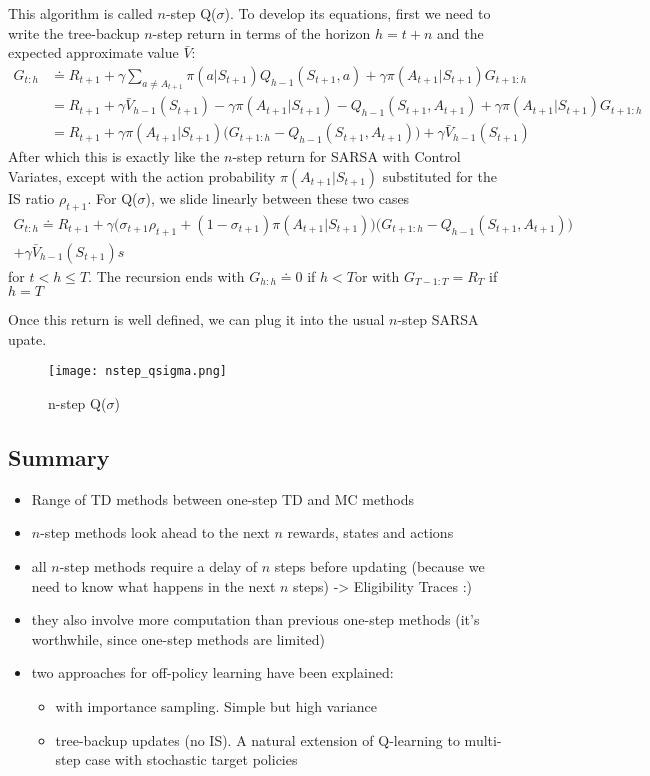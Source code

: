 \documentclass[sutton_barto_notes.tex]{subfiles}
\begin{document}
This algorithm is called $n$-step Q($\sigma$). To develop its equations, first we need to write the tree-backup $n$-step return in terms of the horizon $h = t + n$ and the expected approximate value $\bar{V}$:
\begin{align*}
G_{t:h} & \doteq R_{t+1} + \gamma \sum_{a \neq A_{t+1}} \pi(a| S_{t+1}) Q_{h-1}(S_{t+1}, a) + \gamma \pi(A_{t+1}|S_{t+1}) G_{t+1:h}\\
 & = R_{t+1} + \gamma \bar{V}_{h-1}(S_{t+1}) - \gamma \pi(A_{t+1} | S_{t+1}) - Q_{h-1}(S_{t+1}, A_{t+1}) + \gamma \pi(A_{t+1}|S_{t+1})G_{t+1:h}\\
 & = R_{t+1} + \gamma \pi(A_{t+1} | S_{t+1}) \big( G_{t+1:h} - Q_{h-1}(S_{t+1}, A_{t+1})\big) + \gamma \bar{V}_{h-1}(S_{t+1}) \label{eq:7.17}\tag{7.17}
\end{align*}
After which this is exactly like the $n$-step return for SARSA with Control Variates, except with the action probability $\pi(A_{t+1} | S_{t+1})$ substituted for the IS ratio $\rho_{t+1}$. For Q($\sigma$), we slide linearly between these two cases
\begin{align*}
G_{t:h} \doteq R_{t+1} + \gamma\big(\sigma_{t+1} \rho_{t+1} + (1 - \sigma_{t+1})\pi(A_{t+1}|S_{t+1})\big)\big( G_{t+1:h} - Q_{h-1}(S_{t+1}, A_{t+1})\big) \\+ \gamma \bar{V}_{h-1}(S_{t+1})s
\end{align*}
for $t < h \leq T$. The recursion ends with $G_{h:h} \doteq 0$ if $h < T$or with $G_{T-1:T} = R_T$ if $h = T$

Once this return is well defined, we can plug it into the usual $n$-step SARSA upate.

\begin{figure}[h!]
    \centering
     \texttt{[image: nstep\_qsigma.png]}
    \caption{ n-step Q($\sigma$) }
\end{figure}

\newpage
\subsection{Summary}

\begin{itemize}
\item Range of TD methods between one-step TD and MC methods
\item $n$-step methods look ahead to the next $n$ rewards, states and actions
\item all $n$-step methods require a delay of $n$ steps before updating (because we need to know what happens in the next $n$ steps) -> Eligibility Traces :)
\item they also involve more computation than previous one-step methods (it's worthwhile, since one-step methods are limited)
\item two approaches for off-policy learning have been explained:
\begin{itemize}
	\item with importance sampling. Simple but high variance
	\item tree-backup updates (no IS). A natural extension of Q-learning to multi-step case with stochastic target policies
\end{itemize}
\end{itemize}
\end{document}
